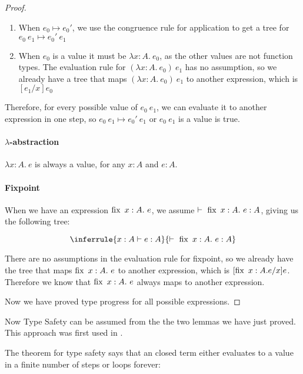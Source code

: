 \begin{proof}
\begin{enumerate}
\item{When $e_0 \mapsto e_0'$, we use the congruence rule for application to get a tree for $e_0 \ e_1 \mapsto e_0' \ e_1$}
\item{When $e_0$ is a value it must be $\lambda x:A. \  e_0$, as the other values are not function types. The evaluation rule for $(\lambda x:A. \ e_0 ) \ e_1$ has no assumption, so we already have a tree that maps $(\lambda x:A. \ e_0 ) \ e_1$ to another expression, which is $[e_1/x]e_0$}
\end{enumerate}

Therefore, for every possible value of $e_0 \ e_1$, we can evaluate it to another expression in one step, so $e_0 \ e_1 \mapsto e_0' \  e_1$ or $e_0 \ e_1$ is a value is true. 

\paragraph{$\lambda$-abstraction} $\lambda x:A. \ e$ is always a value, for any $x:A$ and $e : A$.

\paragraph{Fixpoint} When we have an expression $\fix \ x:A. \ e$, we assume $\vdash \ \operatorname{fix} \ x:A. \ e : A$, giving us the following tree:

$$
\inferrule {x : A \vdash e : A }
  { \vdash \  \fix \ x:A . \ e : A}
$$

There are no assumptions in the evaluation rule for fixpoint, so we already have the tree that maps $\fix \ x:A. \ e$ to another expression, which is  $[\operatorname{fix} \ x:A. e/x]e$. Therefore we know that $\fix \ x:A. \ e$ always maps to another expression. %

Now we have proved type progress for all possible expressions.
\end{proof}

Now Type Safety can be  assumed from the the two lemmas we have just proved. This approach was first used in \citep{Wright94}. 


The theorem for type safety says that an closed term either evaluates to a value in a finite number of steps or loops forever:

\vspace{0.5cm}

